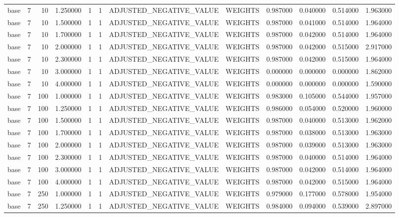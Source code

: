 \begin{tabular}{lrrrllllrrrr}
base & 7 & 10 & 1.250000 & 1 & 1 & ADJUSTED_NEGATIVE_VALUE & WEIGHTS & 0.987000 & 0.040000 & 0.514000 & 1.963000 \\
base & 7 & 10 & 1.500000 & 1 & 1 & ADJUSTED_NEGATIVE_VALUE & WEIGHTS & 0.987000 & 0.041000 & 0.514000 & 1.964000 \\
base & 7 & 10 & 1.700000 & 1 & 1 & ADJUSTED_NEGATIVE_VALUE & WEIGHTS & 0.987000 & 0.042000 & 0.514000 & 1.964000 \\
base & 7 & 10 & 2.000000 & 1 & 1 & ADJUSTED_NEGATIVE_VALUE & WEIGHTS & 0.987000 & 0.042000 & 0.515000 & 2.917000 \\
base & 7 & 10 & 2.300000 & 1 & 1 & ADJUSTED_NEGATIVE_VALUE & WEIGHTS & 0.987000 & 0.042000 & 0.515000 & 1.964000 \\
base & 7 & 10 & 3.000000 & 1 & 1 & ADJUSTED_NEGATIVE_VALUE & WEIGHTS & 0.000000 & 0.000000 & 0.000000 & 1.862000 \\
base & 7 & 10 & 4.000000 & 1 & 1 & ADJUSTED_NEGATIVE_VALUE & WEIGHTS & 0.000000 & 0.000000 & 0.000000 & 1.590000 \\
base & 7 & 100 & 1.000000 & 1 & 1 & ADJUSTED_NEGATIVE_VALUE & WEIGHTS & 0.983000 & 0.105000 & 0.544000 & 1.957000 \\
base & 7 & 100 & 1.250000 & 1 & 1 & ADJUSTED_NEGATIVE_VALUE & WEIGHTS & 0.986000 & 0.054000 & 0.520000 & 1.960000 \\
base & 7 & 100 & 1.500000 & 1 & 1 & ADJUSTED_NEGATIVE_VALUE & WEIGHTS & 0.987000 & 0.040000 & 0.513000 & 1.962000 \\
base & 7 & 100 & 1.700000 & 1 & 1 & ADJUSTED_NEGATIVE_VALUE & WEIGHTS & 0.987000 & 0.038000 & 0.513000 & 1.963000 \\
base & 7 & 100 & 2.000000 & 1 & 1 & ADJUSTED_NEGATIVE_VALUE & WEIGHTS & 0.987000 & 0.039000 & 0.513000 & 1.963000 \\
base & 7 & 100 & 2.300000 & 1 & 1 & ADJUSTED_NEGATIVE_VALUE & WEIGHTS & 0.987000 & 0.040000 & 0.514000 & 1.964000 \\
base & 7 & 100 & 3.000000 & 1 & 1 & ADJUSTED_NEGATIVE_VALUE & WEIGHTS & 0.987000 & 0.042000 & 0.514000 & 1.964000 \\
base & 7 & 100 & 4.000000 & 1 & 1 & ADJUSTED_NEGATIVE_VALUE & WEIGHTS & 0.987000 & 0.042000 & 0.515000 & 1.964000 \\
base & 7 & 250 & 1.000000 & 1 & 1 & ADJUSTED_NEGATIVE_VALUE & WEIGHTS & 0.979000 & 0.177000 & 0.578000 & 1.954000 \\
base & 7 & 250 & 1.250000 & 1 & 1 & ADJUSTED_NEGATIVE_VALUE & WEIGHTS & 0.984000 & 0.094000 & 0.539000 & 2.897000 \\

\end{tabular}
